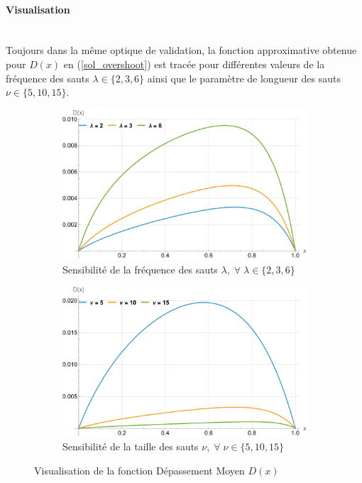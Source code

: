 \paragraph{Visualisation}\phantom{}\\
Toujours dans la même optique de validation, la fonction approximative obtenue pour $D(x)$ en (\ref{sol_overshoot}) est tracée pour différentes valeurs de la fréquence des sauts $\lambda\in\{2,3,6\}$ ainsi que le paramètre de longueur des sauts $\nu\in\{5,10,15\}$.
\begin{figure}[htb]
    \centering
    \begin{subfigure}{0.45\linewidth}
        \includegraphics[width=\linewidth]{img/validation/Ovs/overshoot_lambda.pdf}
        \caption{Sensibilité de la fréquence des sauts $\lambda,\;\forall\;\lambda\in\{2,3,6\}$}\label{fig:Overshoot_lambda_visualisation}
    \end{subfigure}
    \hfill
    \begin{subfigure}{0.45\linewidth}
        \includegraphics[width=\linewidth]{img/validation/Ovs/overshoot_nu.pdf}
        \caption{Sensibilité de la taille des sauts $\nu,\;\forall\;\nu\in\{5,10,15\}$}\label{fig:Overshoot_nu_visualisation}
    \end{subfigure}
    \hfill
    \caption{Visualisation de la fonction Dépassement Moyen $D(x)$}\label{fig:OvershootVisualisation}
\end{figure}
